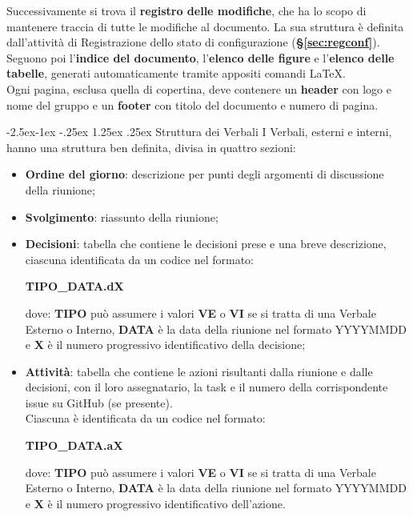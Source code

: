\documentclass[a4paper,12pt]{article}
\makeatletter
\renewcommand\paragraph{\@startsection{paragraph}{4}{\z@}%
            {-2.5ex\@plus -1ex \@minus -.25ex}%
            {1.25ex \@plus .25ex}%
            {\normalfont\normalsize\bfseries}}
\makeatother
\begin{document}
            Successivamente si trova il \textbf{registro delle modifiche}, che ha lo scopo di mantenere traccia di tutte le modifiche al documento.
            La sua struttura è definita dall'attività di Registrazione dello stato di configurazione (\textbf{\S\ref{sec:regconf}}).\\
            Seguono poi l'\textbf{indice del documento}, l'\textbf{elenco delle figure} e l'\textbf{elenco delle tabelle}, generati automaticamente tramite appositi comandi LaTeX.\\
            Ogni pagina, esclusa quella di copertina, deve contenere un \textbf{header} con logo e nome del gruppo e un \textbf{footer} con titolo del documento e numero di pagina.

            \paragraph{Struttura dei Verbali}
                I Verbali, esterni e interni, hanno una struttura ben definita, divisa in quattro sezioni:
                \begin{itemize}
                    \item \textbf{Ordine del giorno}: descrizione per punti degli argomenti di discussione della riunione;
                    \item \textbf{Svolgimento}: riassunto della riunione;
                    \item \textbf{Decisioni}: tabella che contiene le decisioni prese e una breve descrizione, ciascuna identificata da un codice nel formato:
                        \begin{center}
                            \textbf{TIPO\_DATA.dX}
                        \end{center}
                        dove: \textbf{TIPO} può assumere i valori \textbf{VE} o \textbf{VI} se si tratta di una Verbale Esterno o Interno, \textbf{DATA} è la data della riunione nel formato YYYYMMDD e \textbf{X} è il numero progressivo identificativo della decisione;
                    \item \textbf{Attività}: tabella che contiene le azioni risultanti dalla riunione e dalle decisioni, con il loro assegnatario, la task e il numero della corrispondente issue su GitHub (se presente).\\
                        Ciascuna è identificata da un codice nel formato:
                        \begin{center}
                            \textbf{TIPO\_DATA.aX}
                        \end{center}
                        dove: \textbf{TIPO} può assumere i valori \textbf{VE} o \textbf{VI} se si tratta di una Verbale Esterno o Interno, \textbf{DATA} è la data della riunione nel formato YYYYMMDD e \textbf{X} è il numero progressivo identificativo dell'azione.
                \end{itemize}
\end{document}
